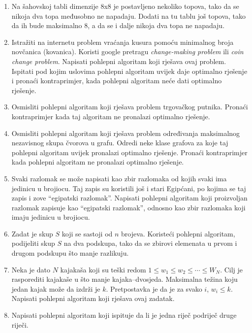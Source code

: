 \documentclass[a4paper, utf8, 11pt, colorlinks]{book}
\theoremstyle{definition}
\begin{document}
\begin{enumerate}
	\item Na šahovskoj tabli dimenzije 8x8 je postavljeno nekoliko topova, tako da se nikoja dva topa međusobno ne napadaju. Dodati na tu tablu još topova, tako da ih bude maksimalno 8, a da se i dalje nikoja dva topa ne napadaju.
	\item Istražiti na internetu problem vraćanja kusura pomoću minimalnog broja novčanica (kovanica). Koristi google pretragu \textit{change-making problem} ili \textit{coin change problem}. Napisati pohlepni algoritam koji rješava ovaj problem. Ispitati pod kojim uslovima pohlepni algoritam uvijek daje optimalno rješenje i pronaći kontraprimjer, kada pohlepni algoritam neće dati optimalno rješenje.

	
	\item Osmisliti pohlepni algoritam koji rješava problem trgovačkog putnika. Pronaći kontraprimjer kada taj algoritam ne pronalazi optimalno rješenje.
	
	\item Osmisliti pohlepni algoritam koji rješava problem određivanja maksimalnog nezavisnog skupa čvorova u grafu. Odredi neke klase grafova za koje taj pohlepni algoritam uvijek pronalazi optimalno rješenje. Pronaći kontraprimjer kada pohlepni algoritam ne pronalazi optimalno rješenje.
	
	\item Svaki razlomak se može napisati kao zbir razlomaka od kojih svaki ima jedinicu u brojiocu. Taj zapis su koristili još i stari Egipćani, po kojima se taj zapis i zove ``egipatski razlomak''. 
	Napisati pohlepni algoritam koji proizvoljan razlomak zapisuje kao ``egipatski razlomak'', odnosno kao zbir razlomaka koji imaju jedinicu u brojiocu.
	
	\item Zadat je skup $S$ koji se sastoji od $n$ brojeva. Koristeći pohlepni algoritam, podijeliti skup $S$ na dva podskupa, tako da se zbirovi elemenata u prvom i drugom podskupu što manje razlikuju.
	
	\item Neka je dato $N$ kajakaša koji su teški redom $1\leqslant w_1\leqslant w_2\leqslant \cdots \leqslant W_N$. Cilj je rasporediti kajakaše u što manje kajaka--dvosjeda. Maksimalna težina koju jedan kajak može da izdrži je $k$. Pretpostavka je da je za svako $i$, $w_i\leqslant k$. Napisati pohlepni algoritam koji rješava ovaj zadatak.
	
	\item  Napisati pohlepni algoritam koji ispituje da li je jedna riječ podriječ druge riječi.
	

\end{enumerate}
\end{document}
